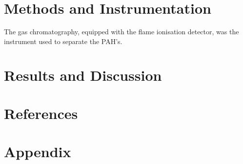 \documentclass[a4paper, 12pt]{article}
\begin{document}

\section{Methods and Instrumentation}
The gas chromatography, equipped with the flame ionisation detector, was the instrument used to separate the PAH's.


\section{Results and Discussion}


\section{References}
\printbibliography


\section{Appendix}

\end{document}
